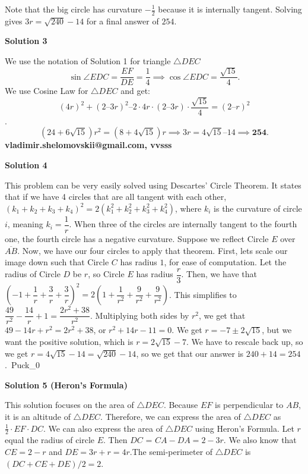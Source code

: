 \begin{enumerate}
 Note that the big circle has curvature $-\frac12$ because it is internally tangent. Solving gives $3r=\sqrt{240}-14$ for a final answer of $\boxed{254}$.

 



\textbf{Solution 3}

We use the notation of Solution 1 for triangle $\triangle DEC$
 \[\sin \angle EDC = \frac {EF}{DE} = \frac {1}{4} \implies \cos \angle EDC =  \frac {\sqrt{15}}{4}.\]We use Cosine Law for $\triangle DEC$ and get:
 \[(4r)^2 +(2 – 3r)^2 – 2 \cdot 4r \cdot (2 – 3r) \cdot  \frac {\sqrt{15}}{4} = (2 – r)^2\].
 \[(24 + 6 \sqrt{15} ) r^2 = (8 + 4 \sqrt {15})r \implies 3r = 4 \sqrt{15} – 14 \implies \boxed{\textbf{254}}.\]\textbf{vladimir.shelomovskii@gmail.com, vvsss}

 



\textbf{Solution 4}

This problem can be very easily solved using Descartes' Circle Theorem. It states that if we have 4 circles that are all tangent with each other, $(k_1 + k_2 + k_3 + k_4)^{2} = 2(k_1^{2} + k_2^{2} + k_3^{2} + k_4^{2})$, where $k_i$ is the curvature of circle $i$, meaning $k_i = \dfrac{1}{r}$. When three of the circles are internally tangent to the fourth one, the fourth circle has a negative curvature. Suppose we reflect Circle $E$ over $\overline{AB}$. Now, we have our four circles to apply that theorem. First, lets scale our image down such that Circle $C$ has radius $1$, for ease of computation. Let the radius of Circle $D$ be $r$, so Circle $E$ has radius $\dfrac{r}{3}$. Then, we have that $(-1 + \dfrac{1}{r} + \dfrac{3}{r} + \dfrac{3}{r})^{2} = 2(1 + \dfrac{1}{r^{2}} + \dfrac{9}{r^{2}} + \dfrac{9}{r^{2}})$. This simplifies to $\dfrac{49}{r^{2}} - \dfrac{14}{r} + 1 = \dfrac{2r^{2} + 38}{r^{2}}$. Multiplying both sides by $r^{2}$, we get that $49 - 14r + r^{2} = 2r^{2} + 38$, or $r^2 + 14r - 11 = 0$. We get $r = -7 \pm 2\sqrt{15}$, but we want the positive solution, which is $r = 2\sqrt{15} - 7$. We have to rescale back up, so we get $r = 4\sqrt{15} - 14 = \sqrt{240} - 14$, so we get that our answer is $240 + 14 = \boxed{254}$.~Puck\_0

 



\textbf{Solution 5 (Heron's Formula)}

This solution focuses on the area of $\triangle DEC$. Because $EF$ is perpendicular to $AB$, it is an altitude of $\triangle DEC$. Therefore, we can express the area of $\triangle DEC$ as $\frac{1}{2}\cdot EF \cdot DC$. We can also express the area of $\triangle DEC$ using Heron's Formula. Let $r$ equal the radius of circle $E$. Then $DC$ = $CA - DA = 2-3r$. We also know that $CE = 2-r$ and $DE = 3r+r=4r$.The semi-perimeter of $\triangle DEC$ is $(DC+CE+DE)/2 = 2$. 


\end{enumerate}
